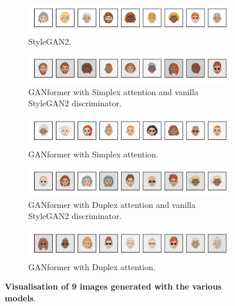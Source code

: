 \documentclass{article}
\begin{document}
\begin{figure}[htpb]
	\centering
	\begin{subfigure}{\linewidth}
		\includegraphics[width=\linewidth]{random_Stylegan2_300kimg.png}
		\vspace{-7mm}
		\caption{StyleGAN2.} 
	\end{subfigure}
	\begin{subfigure}{\linewidth}
		\includegraphics[width=\linewidth]{random_GANFormer_Simplex_D_Stylegan2_300kimg.png}
		\vspace{-7mm}
		\caption{GANformer with Simplex attention and vanilla StyleGAN2 discriminator.}
	\end{subfigure}
	\begin{subfigure}{\linewidth}
		\includegraphics[width=\linewidth]{random_GANFormer_Simplex_D_Att_300kimg.png}
		\vspace{-7mm}
		\caption{GANformer with Simplex attention.}
	\end{subfigure}
	\begin{subfigure}{\linewidth}
		\includegraphics[width=\linewidth]{random_GANFormer_Duplex_D_Stylegan2_300kimg.png}
		\vspace{-7mm}
		\caption{GANformer with Duplex attention and vanilla StyleGAN2 discriminator.}
	\end{subfigure}
	\begin{subfigure}{\linewidth}
		\includegraphics[width=\linewidth]{random_GANFormer_Duplex_D_Att_300kimg.png}
		\vspace{-7mm}
		\caption{GANformer with Duplex attention.}
	\end{subfigure}
	\vspace{3mm}
	\caption{\textbf{Visualisation of 9 images generated with the various models}.}\label{fig:random}
\end{figure}
\end{document}
